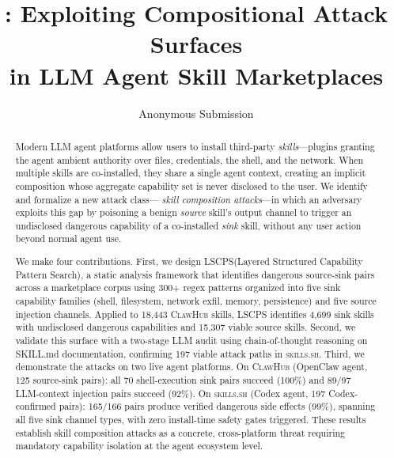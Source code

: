 \documentclass[letterpaper,twocolumn,10pt]{article}
\title{\sysname: Exploiting Compositional Attack Surfaces\\
       in LLM Agent Skill Marketplaces}
\author{Anonymous Submission}
\theoremstyle{definition}
\newcommand{\lscps}{\textsc{LSCPS}\xspace}
\newcommand{\clawhub}{\textsc{ClawHub}\xspace}
\newcommand{\skillssh}{\textsc{skills.sh}\xspace}
\newcommand{\NskillsCH}{18{,}443\xspace}
\newcommand{\NsrcCH}{15{,}307\xspace}
\newcommand{\NsinkCH}{4{,}699\xspace}
\newcommand{\NpatternsLSCPS}{300\xspace}
\newcommand{\NcodexConfirm}{197\xspace}
\newcommand{\NpairsCH}{125\xspace}
\newcommand{\NpairsCHCone}{97\xspace}
\newcommand{\NpairsCHConeok}{89\xspace}
\newcommand{\PairsCHConeRate}{92\%\xspace}
\newcommand{\NpairsCHshell}{70\xspace}
\newcommand{\PairsCHshellRate}{100\%\xspace}
\newcommand{\NpairsSS}{197\xspace}
\newcommand{\NpairsSSlaunched}{166\xspace}
\newcommand{\NpairsSSsuccess}{165\xspace}
\newcommand{\PairsSSrate}{99\%\xspace}
\begin{document}
\maketitle

\begin{abstract}
Modern LLM agent platforms allow users to install
third-party \emph{skills}---plugins granting the agent ambient authority
over files, credentials, the shell, and the network.
When multiple skills are co-installed, they share a single agent context,
creating an implicit composition whose aggregate capability set
is never disclosed to the user.
We identify and formalize a new attack class---
\emph{skill composition attacks}---in which an adversary exploits
this gap by poisoning a benign \emph{source} skill's output channel
to trigger an undisclosed dangerous capability of a co-installed
\emph{sink} skill, without any user action beyond normal agent use.

We make four contributions.
First, we design \lscps (Layered Structured Capability Pattern Search),
a static analysis framework that identifies dangerous source-sink pairs
across a marketplace corpus using \NpatternsLSCPS{}+ regex patterns
organized into five sink capability families (shell, filesystem,
network exfil, memory, persistence) and five source injection channels.
Applied to \NskillsCH{} \clawhub{} skills, \lscps identifies \NsinkCH{}
sink skills with undisclosed dangerous capabilities and \NsrcCH{}
viable source skills.
Second, we validate this surface with a two-stage LLM audit
using chain-of-thought reasoning on SKILL.md documentation,
confirming \NcodexConfirm{} viable attack paths in \skillssh{}.
Third, we demonstrate the attacks on two live agent platforms.
On \clawhub{} (OpenClaw agent, \NpairsCH{} source-sink pairs):
all \NpairsCHshell{} shell-execution sink pairs succeed (\PairsCHshellRate{})
and \NpairsCHConeok/\NpairsCHCone{} LLM-context injection pairs succeed (\PairsCHConeRate{}).
On \skillssh{} (Codex agent, \NpairsSS{} Codex-confirmed pairs):
\NpairsSSsuccess/\NpairsSSlaunched{} pairs produce verified dangerous
side effects (\PairsSSrate{}), spanning all five sink channel types,
with zero install-time safety gates triggered.
These results establish skill composition attacks as a concrete,
cross-platform threat requiring mandatory capability isolation
at the agent ecosystem level.
\end{abstract}
\end{document}
